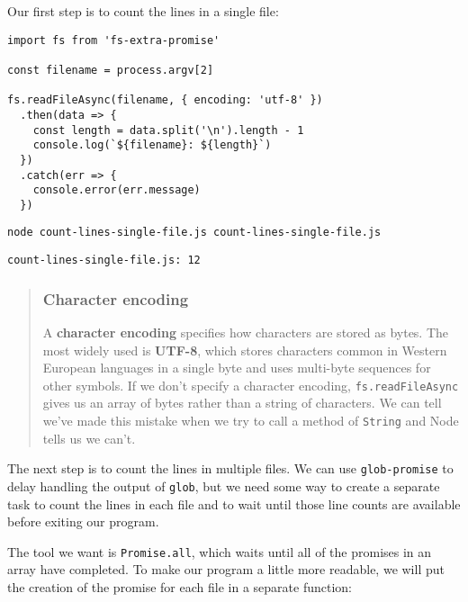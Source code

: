 \documentclass[krantzl]{krantz}
\newcommand{\glossref}[1]{\textbf{#1}}
\newenvironment{callout}{\savenotes\begin{tBox}\begin{quotation}\toggletrue{inbox}\renewcommand{\thempfootnote}{\arabic{footnote}}}{\end{quotation}\vspace{\baselineskip}\end{tBox}\togglefalse{inbox}\spewnotes}
\begin{document}
Our first step is to count the lines in a single file:


\begin{lstlisting}[frame=tblr]
import fs from 'fs-extra-promise'

const filename = process.argv[2]

fs.readFileAsync(filename, { encoding: 'utf-8' })
  .then(data => {
    const length = data.split('\n').length - 1
    console.log(`${filename}: ${length}`)
  })
  .catch(err => {
    console.error(err.message)
  })
\end{lstlisting}



\begin{lstlisting}[frame=shadowbox]
node count-lines-single-file.js count-lines-single-file.js
\end{lstlisting}



\begin{lstlisting}[frame=tblr,backgroundcolor=\color{black!5}]
count-lines-single-file.js: 12
\end{lstlisting}


\begin{callout}


\subsubsection*{Character encoding}


A \glossref{character encoding}
specifies how characters are stored as bytes.
The most widely used is \glossref{UTF-8},
which stores characters common in Western European languages in a single byte
and uses multi-byte sequences for other symbols.
If we don’t specify a character encoding,
\texttt{fs.readFileAsync} gives us an array of bytes rather than a string of characters.
We can tell we’ve made this mistake when we try to call a method of \texttt{String}
and Node tells us we can’t.

\end{callout}


The next step is to count the lines in multiple files.
We can use \texttt{glob-promise} to delay handling the output of \texttt{glob},
but we need some way to create a separate task to count the lines in each file
and to wait until those line counts are available before exiting our program.


The tool we want is \texttt{Promise.all},
which waits until all of the promises in an array have completed.
To make our program a little more readable,
we will put the creation of the promise for each file in a separate function:
\end{document}
